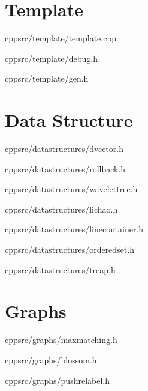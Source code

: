 \documentclass[portrait, 8pt, a4paper, oneside, twocolumn]{extarticle}
\begin{document}
\maketitlepage


\noindent\hrulefill

    \section{Template}

    {}
    {}
    {cpp}{src/template/template.cpp}
    \noindent\hrulefill

    {}
    {}
    {cpp}{src/template/debug.h}
    \noindent\hrulefill

    {}
    {}
    {cpp}{src/template/gen.h}
    \noindent\hrulefill

\section{Data Structure}
    {}
    {}
    {cpp}{src/datastructures/dvector.h}
    \noindent\hrulefill

    {}
    {}
    {cpp}{src/datastructures/rollback.h}
    \noindent\hrulefill

    {}
    {}
    {cpp}{src/datastructures/wavelettree.h}
    \noindent\hrulefill

    {}
    {}
    {cpp}{src/datastructures/lichao.h}
    \noindent\hrulefill

    {}
    {}
    {cpp}{src/datastructures/linecontainer.h}
    \noindent\hrulefill

    {}
    {}
    {cpp}{src/datastructures/orderedset.h}
    \noindent\hrulefill

    {}
    {}
    {cpp}{src/datastructures/treap.h}
    \noindent\hrulefill

\section{Graphs}
    {}
    {}
    {cpp}{src/graphs/maxmatching.h}
    \noindent\hrulefill

    {}
    {}
    {cpp}{src/graphs/blossom.h}
    \noindent\hrulefill

    {}
    {}
    {cpp}{src/graphs/pushrelabel.h}
    \noindent\hrulefill
\end{document}
